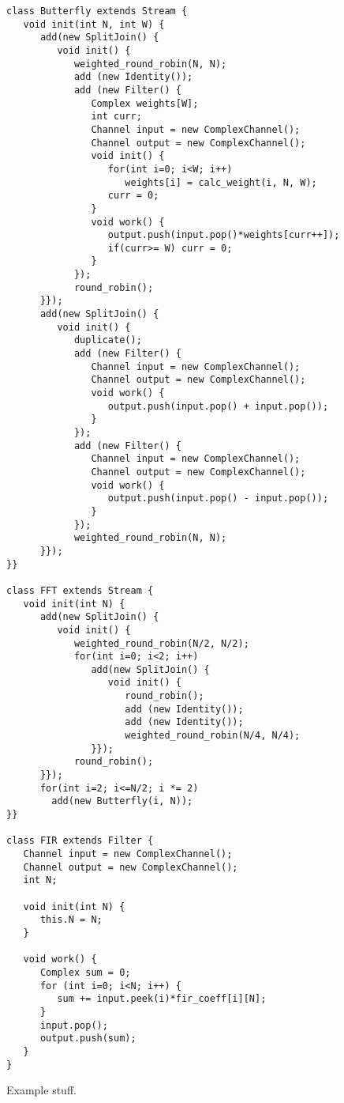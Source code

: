 \begin{figure}[t]
\scriptsize
\begin{verbatim}
class Butterfly extends Stream {
   void init(int N, int W) {
      add(new SplitJoin() {
         void init() {
            weighted_round_robin(N, N);
            add (new Identity());
            add (new Filter() {
               Complex weights[W];
               int curr;
               Channel input = new ComplexChannel();
               Channel output = new ComplexChannel();
               void init() {
                  for(int i=0; i<W; i++)
                     weights[i] = calc_weight(i, N, W);
                  curr = 0;
               }
               void work() {
                  output.push(input.pop()*weights[curr++]);
                  if(curr>= W) curr = 0;
               }    
            });
            round_robin();
      }});
      add(new SplitJoin() {
         void init() {
            duplicate();
            add (new Filter() {   
               Channel input = new ComplexChannel();
               Channel output = new ComplexChannel();
               void work() {
                  output.push(input.pop() + input.pop());
               }
            });
            add (new Filter() {   
               Channel input = new ComplexChannel();
               Channel output = new ComplexChannel();
               void work() {
                  output.push(input.pop() - input.pop());
               }
            });
            weighted_round_robin(N, N);
      }});
}}

class FFT extends Stream {
   void init(int N) {
      add(new SplitJoin() {
         void init() {
            weighted_round_robin(N/2, N/2);
            for(int i=0; i<2; i++) 
               add(new SplitJoin() {
                  void init() {
                     round_robin();
                     add (new Identity());
                     add (new Identity());
                     weighted_round_robin(N/4, N/4);
               }});
            round_robin();
      }});
      for(int i=2; i<=N/2; i *= 2)
        add(new Butterfly(i, N));
}}

class FIR extends Filter {
   Channel input = new ComplexChannel();
   Channel output = new ComplexChannel();           
   int N;

   void init(int N) {
      this.N = N;
   }

   void work() {
      Complex sum = 0;
      for (int i=0; i<N; i++) {
         sum += input.peek(i)*fir_coeff[i][N];
      }
      input.pop();
      output.push(sum);
   }
}
\end{verbatim}
\vspace{-12pt}
\caption{\protect\small Example stuff.
\protect\label{fig1}}
\vspace{-12pt}
\end{figure}

